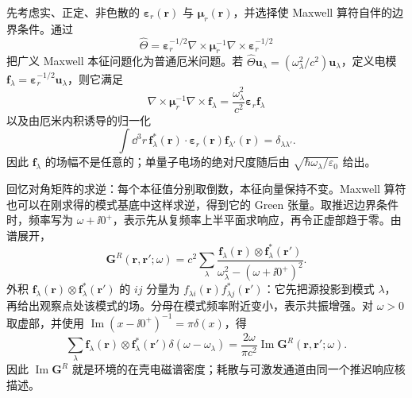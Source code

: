 先考虑实、正定、非色散的 $\boldsymbol\varepsilon_r(\mathbf r)$ 与 $\boldsymbol\mu_r(\mathbf r)$，并选择使 Maxwell 算符自伴的边界条件。通过
\[
\hat\Theta
=\boldsymbol\varepsilon_r^{-1/2}
\nabla\times\boldsymbol\mu_r^{-1}\nabla\times
\boldsymbol\varepsilon_r^{-1/2}
\]
把广义 Maxwell 本征问题化为普通厄米问题。若
$\hat\Theta\mathbf u_\lambda=(\omega_\lambda^2/c^2)\mathbf u_\lambda$，定义电模
$\mathbf f_\lambda=\boldsymbol\varepsilon_r^{-1/2}\mathbf u_\lambda$，则它满足
\[
\nabla\times\boldsymbol\mu_r^{-1}\nabla\times\mathbf f_\lambda
=\frac{\omega_\lambda^2}{c^2}\boldsymbol\varepsilon_r\mathbf f_\lambda
\]
以及由厄米内积诱导的归一化
\begin{equation}
\boxed{
\int\dd^3 r\,
\mathbf f_\lambda^*(\mathbf r)\cdot
\boldsymbol\varepsilon_r(\mathbf r)\mathbf f_{\lambda'}(\mathbf r)
=\delta_{\lambda\lambda'}.}
\label{eq:lossless_electric_mode_normalization}
\end{equation}
因此 $\mathbf f_\lambda$ 的场幅不是任意的；单量子电场的绝对尺度随后由 $\sqrt{\hbar\omega_\lambda/\varepsilon_0}$ 给出。

回忆对角矩阵的求逆：每个本征值分别取倒数，本征向量保持不变。Maxwell 算符也可以在刚求得的模式基底中这样求逆，得到它的 Green 张量。取推迟边界条件时，频率写为 $\omega+\ii0^+$，表示先从复频率上半平面求响应，再令正虚部趋于零。由谱展开，
\begin{equation}
\boxed{
\mathbf G^R(\mathbf r,\mathbf r';\omega)
=c^2\sum_\lambda
\frac{\mathbf f_\lambda(\mathbf r)\otimes\mathbf f_\lambda^*(\mathbf r')}
{\omega_\lambda^2-(\omega+\ii0^+)^2}.}
\label{eq:green_discrete_mode_spectral_representation}
\end{equation}
外积 $\mathbf f_\lambda(\mathbf r)\otimes\mathbf f_\lambda^*(\mathbf r')$ 的 $ij$ 分量为 $f_{\lambda i}(\mathbf r)f_{\lambda j}^*(\mathbf r')$：它先把源投影到模式 $\lambda$，再给出观察点处该模式的场。分母在模式频率附近变小，表示共振增强。对 $\omega>0$ 取虚部，并使用 $\operatorname{Im}(x-\ii0^+)^{-1}=\pi\delta(x)$，得
\begin{equation}
\boxed{
\sum_\lambda
\mathbf f_\lambda(\mathbf r)\otimes\mathbf f_\lambda^*(\mathbf r')
\delta(\omega-\omega_\lambda)
=\frac{2\omega}{\pi c^2}
\operatorname{Im}\mathbf G^R(\mathbf r,\mathbf r';\omega).}
\label{eq:mode_sum_imag_green_identity}
\end{equation}
因此 $\operatorname{Im}\mathbf G^R$ 就是环境的在壳电磁谱密度；耗散与可激发通道由同一个推迟响应核描述。

